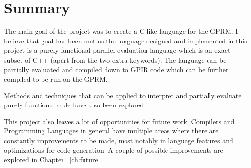 \section{Summary}
The main goal of the project was to create a C-like language for the GPRM.
I believe that goal has been met as the language designed and implemented 
in this project is a purely functional parallel evaluation language which is an exact subset of C++ 
(apart from the two extra keywords). The language can be partially evaluated and compiled down to GPIR code 
which can be further compiled to be run on the GPRM. 

Methods and techniques that can be applied to interpret and partially evaluate purely
functional code have also been explored.

This project also leaves a lot of opportunities for future work. Compilers and Programming Languages in general have
multiple areas where there are constantly improvements to be made, most notably in language features and optimizations 
for code generation. A couple of possible improvements are explored in Chapter ~\ref{ch:future}.





